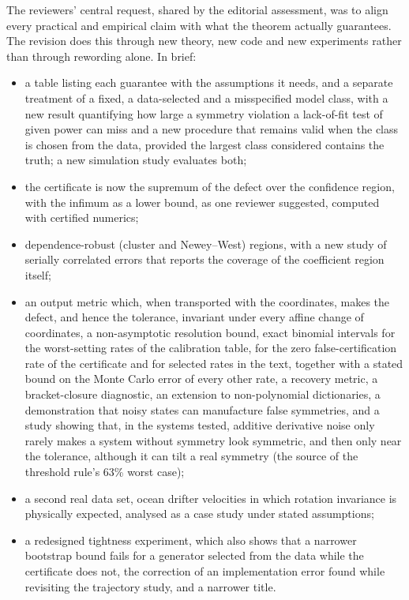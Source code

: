 \documentclass[11pt,a4paper]{article}
\begin{document}
The reviewers' central request, shared by the editorial assessment, was to align
every practical and empirical claim with what the theorem actually guarantees.
The revision does this through new theory, new code and new experiments rather
than through rewording alone. In brief:
\begin{itemize}\itemsep2pt
\item a table listing each guarantee with the assumptions it needs, and a
  separate treatment of a fixed, a data-selected and a misspecified model class,
  with a new result quantifying how large a symmetry violation a lack-of-fit
  test of given power can miss and a new procedure that remains valid when the
  class is chosen from the data, provided the largest class considered
  contains the truth; a new simulation study evaluates both;
\item the certificate is now the supremum of the defect over the confidence
  region, with the infimum as a lower bound, as one reviewer suggested,
  computed with certified numerics;
\item dependence-robust (cluster and Newey--West) regions, with a new study of
  serially correlated errors that reports the coverage of the coefficient region
  itself;
\item an output metric which, when transported with the coordinates, makes the
  defect, and hence the tolerance, invariant under every affine change of
  coordinates, a non-asymptotic resolution bound, exact binomial intervals for
  the worst-setting rates of the calibration table, for the zero
  false-certification rate of the certificate and for selected rates in the
  text, together with a stated bound on the Monte Carlo error of every other
  rate, a recovery metric, a bracket-closure diagnostic, an extension to
  non-polynomial dictionaries, a demonstration that noisy states can
  manufacture false symmetries, and a study showing that, in the systems
  tested, additive derivative noise only rarely makes a system without
  symmetry look symmetric, and then only near the tolerance, although it
  can tilt a real symmetry (the source of the threshold rule's 63\% worst
  case);
\item a second real data set, ocean drifter velocities in which rotation
  invariance is physically expected, analysed as a case study under stated
  assumptions;
\item a redesigned tightness experiment, which also shows that a narrower
  bootstrap bound fails for a generator selected from the data while the
  certificate does not, the correction of an implementation error found while
  revisiting the trajectory study, and a narrower title.
\end{itemize}
\end{document}
